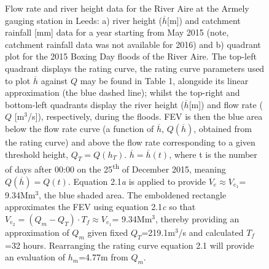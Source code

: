 \documentclass[11pt,a4paper]{article}
\begin{document}
\begin{figure}[ht!]
\centering
{}
\hfill
{}
\caption{Flow rate and river height data for the River Aire at the Armely gauging station in Leeds: a) river height ($\overline{h}$[m]) \cite{Aire} and catchment rainfall [mm] data \cite{NRFA} for a year starting from May 2015 (note, catchment rainfall data was not available for 2016) and b) quadrant plot for the 2015 Boxing Day floods of the River Aire. The top-left quadrant displays the rating curve, the rating curve parameters used to plot $\overline{h}$ against $Q$ may be found in Table 1, alongside its linear approximation (the blue dashed line){;} whilst the top-right and bottom-left quadrants display the river height ($\overline{h}$[m]) and flow rate ($Q$ [m$^3$/s]), respectively, during the floods. FEV is then the blue area below the flow rate curve (a function of $\overline{h}$, $Q(\overline{h})$, obtained from the rating curve) and above the flow rate corresponding to a given threshold height, $Q_T =Q(h_T)$. $\overline{h}=\overline{h}(t)$, where t is the number of days after 00:00 on the 25\textsuperscript{th} of December 2015, meaning $Q(\overline{h})=Q(t)$. Equation 2.1\textit{a} is applied to provide $V_e \approx V_{e_1}$= 9.34Mm$^3$, the blue shaded area. The emboldened rectangle approximates the FEV using equation 2.1\textit{c} so that $V_{e_2}= (Q_m -Q_T )\cdot T_f \approx V_{e_1}$= 9.34Mm$^3$, thereby providing an approximation of $Q_m$ given fixed $Q_T$=219.1m$^3$/s and calculated $T_f$=32 hours. Rearranging the rating curve equation 2.1 will provide an evaluation of $h_m$=4.77m from $Q_m$.}
\end{figure}
\end{document}
